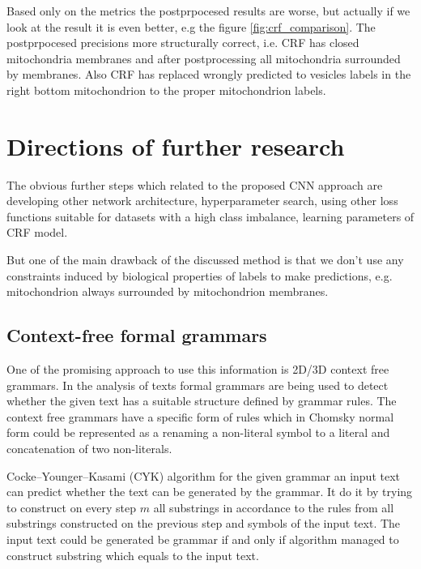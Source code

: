 \documentclass[twocolumn, a4paper]{article}
\theoremstyle{definition}
\begin{document}
Based only on the metrics the postprpocesed results are worse, but actually if we look at the result it is even better,
e.g the figure \ref{fig:crf_comparison}. The postprpocesed precisions more structurally correct, i.e. CRF has closed mitochondria
membranes and after postprocessing all mitochondria surrounded by membranes. Also CRF has replaced wrongly predicted
to vesicles labels in the right bottom mitochondrion to the proper mitochondrion labels.

\section{Directions of further research}

The obvious further steps which related to the proposed CNN approach are developing other
network architecture, hyperparameter search, using other loss functions suitable for
datasets with a high class imbalance, learning parameters of CRF model.

But one of the main drawback of the discussed method is that we don't use any constraints induced by
biological properties of labels to make predictions, e.g. mitochondrion always surrounded by
mitochondrion membranes.

\subsection{Context-free formal grammars}
One of the promising approach to use this information is 2D/3D context free grammars. In the analysis of texts
formal grammars are being used to detect whether the given text has a suitable structure defined by grammar rules.
The context free grammars have a specific form of rules which in Chomsky normal form could be represented as a
renaming a non-literal symbol to a literal and concatenation of two non-literals.

Cocke–Younger–Kasami (CYK) algorithm \cite{sakai1961syntax} for the given grammar an input text can predict whether the text
can be generated by the grammar. It do it by trying to construct on every step \( m \) all substrings in accordance to the rules from all
substrings constructed on the previous step and symbols of the input text. The input text could be generated be grammar
if and only if algorithm managed to construct substring which equals to the input text.
\end{document}
